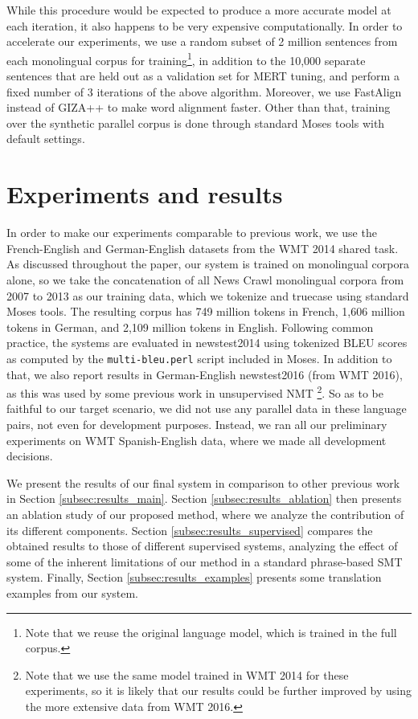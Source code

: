 \documentclass[11pt,a4paper]{article}
\begin{document}
While this procedure would be expected to produce a more accurate model at each iteration, it also happens to be very expensive computationally. In order to accelerate our experiments, we use a random subset of 2 million sentences from each monolingual corpus for training\footnote{Note that we reuse the original language model, which is trained in the full corpus.}, in addition to the 10,000 separate sentences that are held out as a validation set for MERT tuning, and perform a fixed number of 3 iterations of the above algorithm. Moreover, we use FastAlign \citep{dyer2013simple} instead of GIZA++ to make word alignment faster. Other than that, training over the synthetic parallel corpus is done through standard Moses tools with default settings.


\section{Experiments and results} \label{sec:experiments}

In order to make our experiments comparable to previous work, we use the French-English and German-English datasets from the WMT 2014 shared task. As discussed throughout the paper, our system is trained on monolingual corpora alone, so we take the concatenation of all News Crawl monolingual corpora from 2007 to 2013 as our training data, which we tokenize and truecase using standard Moses tools. The resulting corpus has 749 million tokens in French, 1,606 million tokens in German, and 2,109 million tokens in English. Following common practice, the systems are evaluated in newstest2014 using tokenized BLEU scores as computed by the \texttt{multi-bleu.perl} script included in Moses. In addition to that, we also report results in German-English newstest2016 (from WMT 2016), as this was used by some previous work in unsupervised NMT \citep{lample2018unsupervised,yang2018unsupervised}\footnote{Note that we use the same model trained in WMT 2014 for these experiments, so it is likely that our results could be further improved by using the more extensive data from WMT 2016.}. So as to be faithful to our target scenario, we did not use any parallel data in these language pairs, not even for development purposes. Instead, we ran all our preliminary experiments on WMT Spanish-English data, where we made all development decisions.

We present the results of our final system in comparison to other previous work in Section \ref{subsec:results_main}. Section \ref{subsec:results_ablation} then presents an ablation study of our proposed method, where we analyze the contribution of its different components. Section \ref{subsec:results_supervised} compares the obtained results to those of different supervised systems, analyzing the effect of some of the inherent limitations of our method in a standard phrase-based SMT system. Finally, Section \ref{subsec:results_examples} presents some translation examples from our system.
\end{document}
